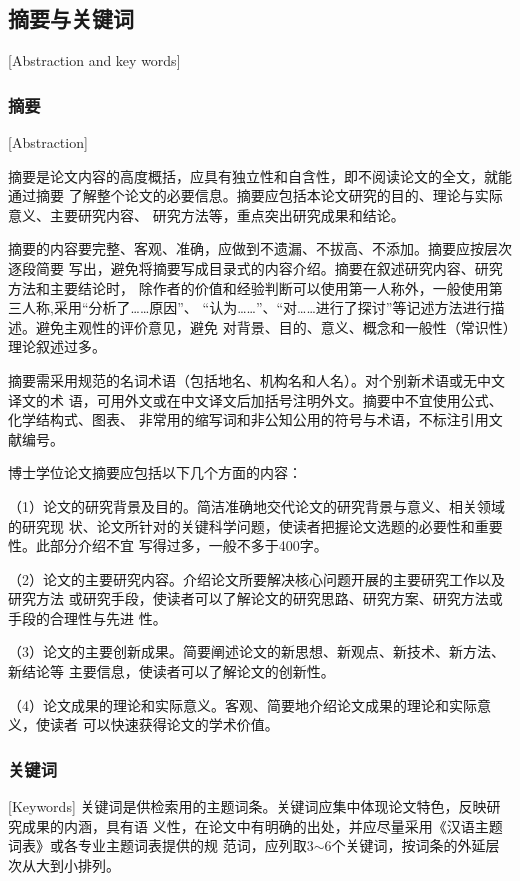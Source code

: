 \subsection{摘要与关键词}[Abstraction and key words]
\subsubsection{摘要}[Abstraction]

摘要是论文内容的高度概括，应具有独立性和自含性，即不阅读论文的全文，就能通过摘要
了解整个论文的必要信息。摘要应包括本论文研究的目的、理论与实际意义、主要研究内容、
研究方法等，重点突出研究成果和结论。

摘要的内容要完整、客观、准确，应做到不遗漏、不拔高、不添加。摘要应按层次逐段简要
写出，避免将摘要写成目录式的内容介绍。摘要在叙述研究内容、研究方法和主要结论时，
除作者的价值和经验判断可以使用第一人称外，一般使用第三人称,采用“分析了……原因”、
“认为……”、“对……进行了探讨”等记述方法进行描述。避免主观性的评价意见，避免
对背景、目的、意义、概念和一般性（常识性）理论叙述过多。

摘要需采用规范的名词术语（包括地名、机构名和人名）。对个别新术语或无中文译文的术
语，可用外文或在中文译文后加括号注明外文。摘要中不宜使用公式、化学结构式、图表、
非常用的缩写词和非公知公用的符号与术语，不标注引用文献编号。

博士学位论文摘要应包括以下几个方面的内容：

（1）论文的研究背景及目的。简洁准确地交代论文的研究背景与意义、相关领域的研究现
状、论文所针对的关键科学问题，使读者把握论文选题的必要性和重要性。此部分介绍不宜
写得过多，一般不多于400字。

（2）论文的主要研究内容。介绍论文所要解决核心问题开展的主要研究工作以及研究方法
或研究手段，使读者可以了解论文的研究思路、研究方案、研究方法或手段的合理性与先进
性。

（3）论文的主要创新成果。简要阐述论文的新思想、新观点、新技术、新方法、新结论等
主要信息，使读者可以了解论文的创新性。

（4）论文成果的理论和实际意义。客观、简要地介绍论文成果的理论和实际意义，使读者
可以快速获得论文的学术价值。

\subsubsection{关键词}[Keywords]
关键词是供检索用的主题词条。关键词应集中体现论文特色，反映研究成果的内涵，具有语
义性，在论文中有明确的出处，并应尽量采用《汉语主题词表》或各专业主题词表提供的规
范词，应列取3$\sim$6个关键词，按词条的外延层次从大到小排列。

